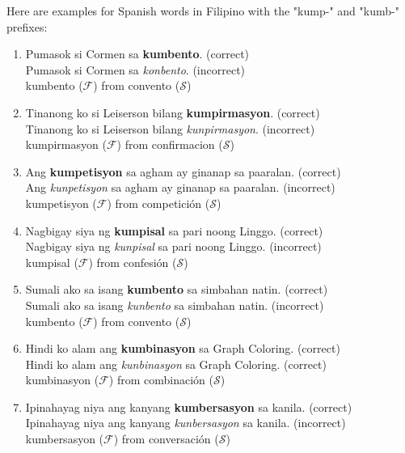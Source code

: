 \begin{example}
    Here are examples for Spanish words in Filipino with the "kump-" and "kumb-"
    prefixes:
\end{example}
\begin{enumerate}
    \item Pumasok si Cormen sa \textbf{kumbento}. (correct) \\
          Pumasok si Cormen sa \textit{konbento}. (incorrect) \\
          kumbento (\(\mathcal{F}\)) from convento (\(\mathcal{S}\))
    \item Tinanong ko si Leiserson bilang \textbf{kumpirmasyon}. (correct) \\
          Tinanong ko si Leiserson bilang \textit{kunpirmasyon}. (incorrect) \\
          kumpirmasyon (\(\mathcal{F}\)) from confirmacion (\(\mathcal{S}\))
    \item Ang \textbf{kumpetisyon} sa agham ay ginanap sa paaralan. (correct) \\
          Ang \textit{kunpetisyon} sa agham ay ginanap sa paaralan. (incorrect) \\
          kumpetisyon (\(\mathcal{F}\)) from competición (\(\mathcal{S}\))
    \item Nagbigay siya ng \textbf{kumpisal} sa pari noong Linggo. (correct) \\
          Nagbigay siya ng \textit{kunpisal} sa pari noong Linggo. (incorrect) \\
          kumpisal (\(\mathcal{F}\)) from confesión (\(\mathcal{S}\))
    \item Sumali ako sa isang \textbf{kumbento} sa simbahan natin. (correct) \\
          Sumali ako sa isang \textit{kunbento} sa simbahan natin. (incorrect) \\
          kumbento (\(\mathcal{F}\)) from convento (\(\mathcal{S}\))
    \item Hindi ko alam ang \textbf{kumbinasyon} sa Graph Coloring. (correct) \\
          Hindi ko alam ang \textit{kunbinasyon} sa Graph Coloring. (correct) \\
          kumbinasyon (\(\mathcal{F}\)) from combinación (\(\mathcal{S}\))
    \item Ipinahayag niya ang kanyang \textbf{kumbersasyon} sa kanila. (correct) \\
          Ipinahayag niya ang kanyang \textit{kunbersasyon} sa kanila. (incorrect) \\
          kumbersasyon (\(\mathcal{F}\)) from conversación (\(\mathcal{S}\))

\end{enumerate}

